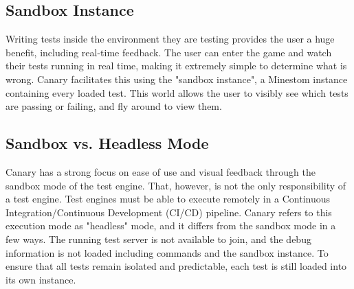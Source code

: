 \documentclass{article}
\begin{document}
\begin{doublespacing}

\subsection{Sandbox Instance}
Writing tests inside the environment they are testing provides the user a huge benefit, including real-time feedback. The user can enter the game and watch their tests running in real time, making it extremely simple to determine what is wrong. Canary facilitates this using the "sandbox instance", a Minestom instance containing every loaded test. This world allows the user to visibly see which tests are passing or failing, and fly around to view them.

\subsection{Sandbox vs. Headless Mode}
Canary has a strong focus on ease of use and visual feedback through the sandbox mode of the test engine. That, however, is not the only responsibility of a test engine. Test engines must be able to execute remotely in a Continuous Integration/Continuous Development (CI/CD) pipeline. Canary refers to this execution mode as "headless" mode, and it differs from the sandbox mode in a few ways. The running test server is not available to join, and the debug information is not loaded including commands and the sandbox instance. To ensure that all tests remain isolated and predictable, each test is still loaded into its own instance.


\end{doublespacing}
\end{document}
